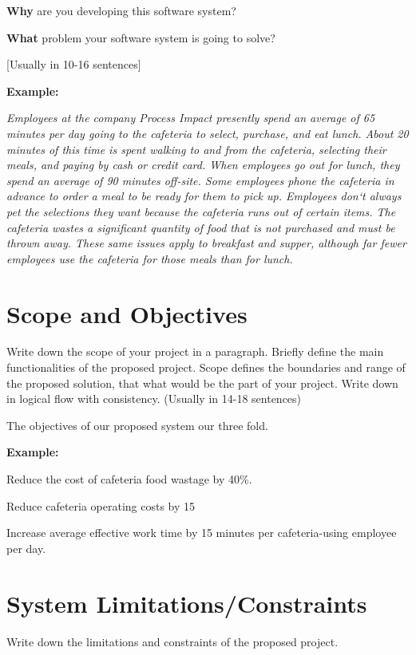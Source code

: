 \documentclass[A4paper,12pt]{report}
\theoremstyle{plain}
\theoremstyle{definition}
\theoremstyle{remark}
\numberwithin{equation}{section}
\begin{document}
\textbf{Why} are you developing this software system? 

\textbf{What} problem your software system is going to solve?

[Usually in 10-16 sentences]

\textbf{Example:}

\textit{Employees at the company Process Impact presently spend an average of 65 minutes per day going to the cafeteria to select, purchase, and eat lunch. About 20 minutes of this time is spent walking to and from the cafeteria, selecting their meals, and paying by cash or credit card. When employees go out for lunch, they spend an average of 90 minutes off-site. Some employees phone the cafeteria in advance to order a meal to be ready for them to pick up. Employees don‘t always pet the selections they want because the cafeteria runs out of certain items. The cafeteria wastes a significant quantity of food that is not purchased and must be thrown away. These same issues apply to breakfast and supper, although far fewer employees use the cafeteria for those meals than for lunch.}

\section{Scope and Objectives}
Write down the scope of your project in a paragraph. Briefly define the main functionalities of the proposed project. Scope defines the boundaries and range of the proposed solution, that what would be the part of your project. Write down in logical flow with consistency. 
(Usually in 14-18 sentences)

The objectives of our proposed system our three fold. 

\newlength{\desclabelwidth} 
\addtolength{\desclabelwidth}{\labelsep}
\textbf{Example:}
\begin{description}[noitemsep,nolistsep,leftmargin=2cm]
    \item[PO1] Reduce the cost of cafeteria food wastage by 40\%.
    \item[PO2] Reduce cafeteria operating costs by 15%
    \item[PO3] Increase average effective work time by 15 minutes per cafeteria-using employee per day.
\end{description}


\section{System Limitations/Constraints}
Write down the limitations and constraints of the proposed project. 
\end{document}
